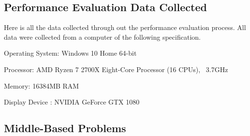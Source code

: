 \documentclass{l4proj}
\begin{document}
\begin{appendices}

\chapter{Performance Evaluation Data Collected}

Here is all the data collected through out the performance evaluation process. All data were collected from a computer of the following specification.

Operating System: Windows 10 Home 64-bit

Processor: AMD Ryzen 7 2700X Eight-Core Processor          (16 CPUs), ~3.7GHz

Memory: 16384MB RAM

Display Device : NVIDIA GeForce GTX 1080



\section{Middle-Based Problems}


\end{appendices}
\end{document}
